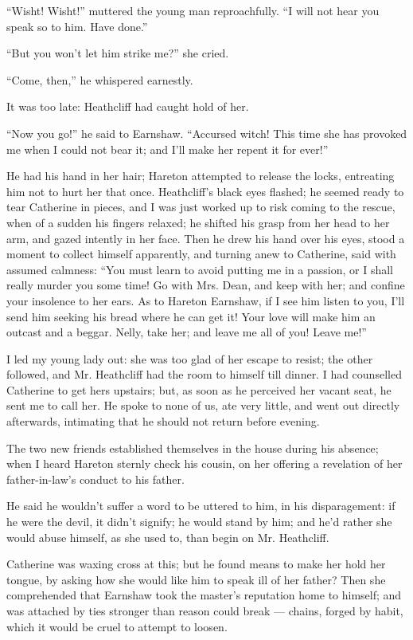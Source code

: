 \par “Wisht! Wisht!” muttered the young man reproachfully. “I will not hear you speak so to him. Have done.”
\par “But you won't let him strike me?” she cried.
\par “Come, then,” he whispered earnestly.
\par It was too late: Heathcliff had caught hold of her.
\par “Now you go!” he said to Earnshaw. “Accursed witch! This time she has provoked me when I could not bear it; and I'll make her repent it for ever!”
\par He had his hand in her hair; Hareton attempted to release the locks, entreating him not to hurt her that once. Heathcliff's black eyes flashed; he seemed ready to tear Catherine in pieces, and I was just worked up to risk coming to the rescue, when of a sudden his fingers relaxed; he shifted his grasp from her head to her arm, and gazed intently in her face. Then he drew his hand over his eyes, stood a moment to collect himself apparently, and turning anew to Catherine, said with assumed calmness: “You must learn to avoid putting me in a passion, or I shall really murder you some time! Go with Mrs. Dean, and keep with her; and confine your insolence to her ears. As to Hareton Earnshaw, if I see him listen to you, I'll send him seeking his bread where he can get it! Your love will make him an outcast and a beggar. Nelly, take her; and leave me all of you! Leave me!”
\par I led my young lady out: she was too glad of her escape to resist; the other followed, and Mr. Heathcliff had the room to himself till dinner. I had counselled Catherine to get hers upstairs; but, as soon as he perceived her vacant seat, he sent me to call her. He spoke to none of us, ate very little, and went out directly afterwards, intimating that he should not return before evening.
\par The two new friends established themselves in the house during his absence; when I heard Hareton sternly check his cousin, on her offering a revelation of her father-in-law's conduct to his father.
\par He said he wouldn't suffer a word to be uttered to him, in his disparagement: if he were the devil, it didn't signify; he would stand by him; and he'd rather she would abuse himself, as she used to, than begin on Mr. Heathcliff.
\par Catherine was waxing cross at this; but he found means to make her hold her tongue, by asking how she would like him to speak ill of her father? Then she comprehended that Earnshaw took the master's reputation home to himself; and was attached by ties stronger than reason could break — chains, forged by habit, which it would be cruel to attempt to loosen.
